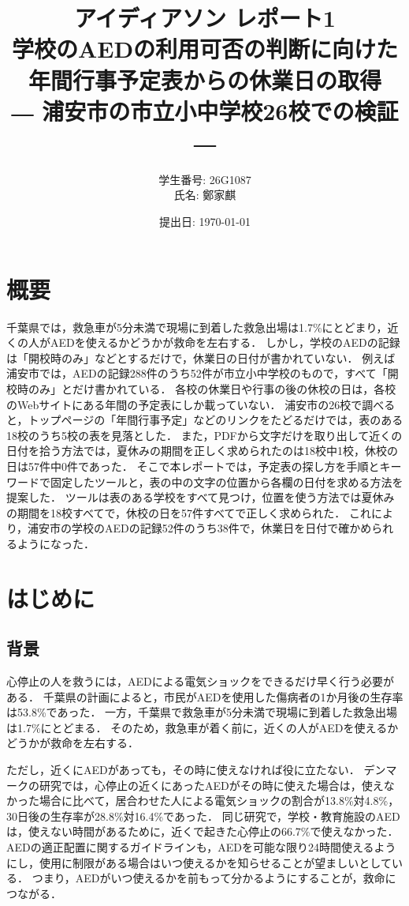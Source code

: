 \documentclass[a4paper,12pt,oneside]{jex}
\title{
  \vspace{20mm}
  {\large アイディアソン レポート1}\\[8pt]
  {\LARGE 学校のAEDの利用可否の判断に向けた\\年間行事予定表からの休業日の取得}\\[8pt]
  {\large ― 浦安市の市立小中学校26校での検証 ―}\\[4pt]
}
\author{
  学生番号: 26G1087 \\
  氏名: 鄭家麒 \\[4pt]
}
\date{提出日: \today}
\begin{document}
\thispagestyle{empty}
\setcounter{tocdepth}{3}


\maketitle
\section*{概要}
千葉県では，救急車が5分未満で現場に到着した救急出場は1.7\%にとどまり，近くの人がAEDを使えるかどうかが救命を左右する．
しかし，学校のAEDの記録は「開校時のみ」などとするだけで，休業日の日付が書かれていない．
例えば浦安市では，AEDの記録288件のうち52件が市立小中学校のもので，すべて「開校時のみ」とだけ書かれている．
各校の休業日や行事の後の休校の日は，各校のWebサイトにある年間の予定表にしか載っていない．
浦安市の26校で調べると，トップページの「年間行事予定」などのリンクをたどるだけでは，表のある18校のうち5校の表を見落とした．
また，PDFから文字だけを取り出して近くの日付を拾う方法では，夏休みの期間を正しく求められたのは18校中1校，休校の日は57件中0件であった．
そこで本レポートでは，予定表の探し方を手順とキーワードで固定したツールと，表の中の文字の位置から各欄の日付を求める方法を提案した．
ツールは表のある学校をすべて見つけ，位置を使う方法では夏休みの期間を18校すべてで，休校の日を57件すべてで正しく求められた．
これにより，浦安市の学校のAEDの記録52件のうち38件で，休業日を日付で確かめられるようになった．

\section{はじめに}
\label{sec:introduction}

\subsection{背景}
\label{subsec:background}

心停止の人を救うには，AEDによる電気ショックをできるだけ早く行う必要がある．
千葉県の計画によると，市民がAEDを使用した傷病者の1か月後の生存率は53.8\%であった\cite{chiba_plan}．
一方，千葉県で救急車が5分未満で現場に到着した救急出場は1.7\%にとどまる\cite{chiba_r7}．
そのため，救急車が着く前に，近くの人がAEDを使えるかどうかが救命を左右する．

ただし，近くにAEDがあっても，その時に使えなければ役に立たない．
デンマークの研究では，心停止の近くにあったAEDがその時に使えた場合は，使えなかった場合に比べて，居合わせた人による電気ショックの割合が13.8\%対4.8\%，30日後の生存率が28.8\%対16.4\%であった\cite{karlsson}．
同じ研究で，学校・教育施設のAEDは，使えない時間があるために，近くで起きた心停止の66.7\%で使えなかった\cite{karlsson}．
AEDの適正配置に関するガイドラインも，AEDを可能な限り24時間使えるようにし，使用に制限がある場合はいつ使えるかを知らせることが望ましいとしている\cite{guide}．
つまり，AEDがいつ使えるかを前もって分かるようにすることが，救命につながる．
\end{document}
